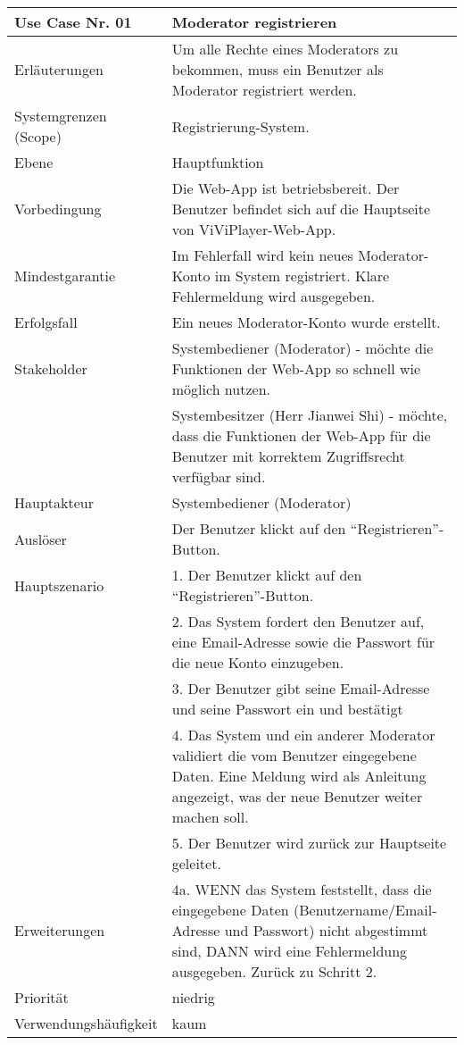 \begin{tabularx}{\linewidth}{|l|X|}
	\hline
	Use Case Nr. 01			& \textbf{Moderator registrieren} \\ \hline
	Erläuterungen			& Um alle Rechte eines Moderators zu bekommen, muss ein 
							Benutzer als Moderator registriert werden. \\ \hline
	Systemgrenzen (Scope)	& Registrierung-System. \\ \hline
	Ebene					& Hauptfunktion \\ \hline
	Vorbedingung			& Die Web-App ist betriebsbereit. Der Benutzer befindet sich auf die 
							  Hauptseite von ViViPlayer-Web-App. \\ \hline
	Mindestgarantie			& Im Fehlerfall wird kein neues Moderator-Konto im System 
	                          registriert. Klare Fehlermeldung wird ausgegeben. \\ \hline
	Erfolgsfall  			& Ein neues Moderator-Konto wurde erstellt. \\ \hline
	Stakeholder				& Systembediener (Moderator) - möchte die Funktionen der Web-App so 
							  schnell wie möglich nutzen. \\
							& Systembesitzer (Herr Jianwei Shi) - möchte, dass die Funktionen 
							  der Web-App für die Benutzer mit korrektem Zugriffsrecht verfügbar sind.\\ \hline
	Hauptakteur				& Systembediener (Moderator) \\ \hline
	Auslöser				& Der Benutzer klickt auf den ``Registrieren''-Button. \\ \hline	
	Hauptszenario			& 1. Der Benutzer klickt auf den ``Registrieren''-Button. \\
							& 2. Das System fordert den Benutzer auf, eine Email-Adresse 
							  sowie die Passwort für die neue Konto einzugeben. \\
							& 3. Der Benutzer gibt seine Email-Adresse und seine Passwort 
							  ein und bestätigt \\
							& 4. Das System und ein anderer Moderator validiert die vom 
							  Benutzer eingegebene Daten. Eine Meldung wird als 
							  Anleitung angezeigt, was der neue Benutzer weiter machen soll. \\
							& 5. Der Benutzer wird zurück zur Hauptseite geleitet. 
							  \\ \hline
	Erweiterungen			& 4a. WENN das System feststellt, dass die eingegebene Daten 
							  (Benutzername/Email-Adresse und Passwort) nicht abgestimmt sind, DANN wird eine Fehlermeldung ausgegeben. Zurück zu Schritt 2. \\ \hline
	Priorität				& niedrig \\ \hline
	Verwendungshäufigkeit	& kaum \\ \hline
\end{tabularx}
